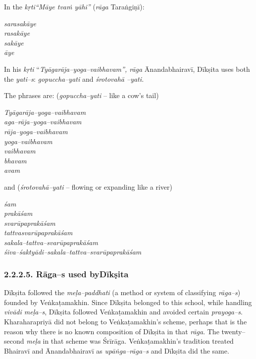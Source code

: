 In the \textit{kṛti“Māye tvaṁ yāhi”} (\textit{rāga} Taraṅgiṇī):

\begin{myquote}
\textit{sarasakāye}\\\textit{rasakāye}\\\textit{sakāye}\\\textit{āye}
\end{myquote}

In his \textit{kṛti} “\textit{Tyāgarāja–yoga–vaibhavam”, rāga} Ānandabhairavī, Dīkṣita uses both the \textit{yati–s}: \textit{gopuccha–yati} and \textit{śrotovahā –yati.}

The phrases are: (\textit{gopuccha–yati} – like a cow’s tail)

\begin{myquote}
\textit{Tyāgarāja–yoga–vaibhavam}\\\textit{aga–rāja–yoga–vaibhavam}\\\textit{rāja–yoga–vaibhavam}\\\textit{yoga–vaibhavam}\\\textit{vaibhavam}\\\textit{bhavam}\\\textit{avam}
\end{myquote}

and (\textit{śrotovahā–yati} – flowing or expanding like a river)

\begin{myquote}
\textit{śam}\\\textit{prakāśam}\\\textit{svarūpaprakāśam}\\\textit{tattvasvarūpaprakāśam}\\\textit{sakala–tattva–svarūpaprakāśam}\\\textit{śiva–śaktyādi–sakala–tattva–svarūpaprakāśam}
\end{myquote}

\vspace{-.4cm}

\subsubsection*{2.2.2.5. Rāga–s used byDīkṣita}

Dīkṣita followed the \textit{meḷa–paddhati} (a method or system of classifying \textit{rāga–s}) founded by Veṅkaṭamakhin. Since Dīkṣita belonged to this school, while handling \textit{vivādi meḷa–s}, Dīkṣita followed Veṅkaṭamakhin and avoided certain \textit{prayoga–s}. Kharaharapriyā did not belong to Veṅkaṭamakhin’s scheme, perhaps that is the reason why there is no known composition of Dīkṣita in that \textit{rāga}. The twenty–second \textit{meḷa} in that scheme was Śrīrāga. Veṅkaṭamakhin’s tradition treated Bhairavī and Ānandabhairavī as \textit{upāṅga–rāga–s} and Dīkṣita did the same.

